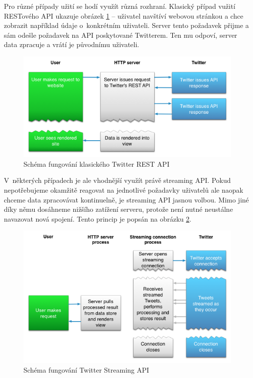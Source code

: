 \documentclass[thesis=B,czech]{FITthesis}[2012/06/26]
\begin{document}
	Pro různé případy užití se hodí využít různá rozhraní. Klasický případ vužití RESTového API ukazuje obrázek \ref{fig:twitter_rest} -- uživatel navštíví webovou stránkou a chce zobrazit například údaje o~konkrétním uživateli. Server tento požadavek přijme a sám odešle požadavek na API poskytované Twitterem. Ten mu odpoví, server data zpracuje a vrátí je původnímu uživateli. 

\begin{figure}[ht]
   	\centering
   	\includegraphics[width=1\textwidth]{images/twitter-rest.png}
   	\caption{Schéma fungování klasického Twitter REST API\cite{twitter-rest-stream}}
   	\label{fig:twitter_rest}
\end{figure}

	V~některých případech je ale vhodnější využít právě streaming API. Pokud nepotřebujeme okamžitě reagovat na jednotlivé požadavky uživatelů ale naopak chceme data zpracovávat kontinuelně, je streaming API jasnou volbou. Mimo jiné díky němu dosáhneme nižšího zatížení serveru, protože není nutné neustálne navazovat nová spojení. Tento princip je popsán na obrázku \ref{fig:twitter_streaming}. 

\begin{figure}[ht]
   	\centering
   	\includegraphics[width=1\textwidth]{images/twitter-streaming.png}
   	\caption{Schéma fungování Twitter Streaming API\cite{twitter-rest-stream}}
   	\label{fig:twitter_streaming}
\end{figure}
\end{document}
